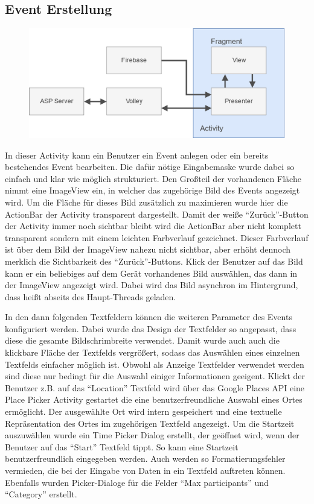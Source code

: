 \documentclass{scrartcl}
\begin{document}
\subsection{Event Erstellung}

\begin{figure}[h!tbp]
  \includegraphics[width=\textwidth]{img/architecture}
\end{figure}

In dieser Activity kann ein Benutzer ein Event anlegen oder ein bereits
bestehendes Event bearbeiten. Die dafür nötige Eingabemaske wurde dabei so
einfach und klar wie möglich strukturiert. Den Großteil der vorhandenen Fläche
nimmt eine ImageView ein, in welcher das zugehörige Bild des Events angezeigt
wird. Um die Fläche für dieses Bild zusätzlich zu maximieren wurde hier die
ActionBar der Activity transparent dargestellt. Damit der weiße
\enquote{Zurück}-Button der Activity immer noch sichtbar bleibt wird die
ActionBar aber nicht komplett transparent sondern mit einem leichten Farbverlauf
gezeichnet. Dieser Farbverlauf ist über dem Bild der ImageView nahezu nicht
sichtbar, aber erhöht dennoch merklich die Sichtbarkeit des
\enquote{Zurück}-Buttons. Klick der Benutzer auf das Bild kann er ein beliebiges
auf dem Gerät vorhandenes Bild auswählen, das dann in der ImageView angezeigt
wird. Dabei wird das Bild asynchron im Hintergrund, dass heißt abseits des
Haupt-Threads geladen.

In den dann folgenden Textfeldern können die weiteren Parameter des Events
konfiguriert werden. Dabei wurde das Design der Textfelder so angepasst, dass
diese die gesamte Bildschrimbreite verwendet. Damit wurde auch auch die
klickbare Fläche der Textfelds vergrößert, sodass das Auswählen eines einzelnen
Textfelds einfacher möglich ist. Obwohl als Anzeige Textfelder verwendet werden
sind diese nur bedingt für die Auswahl einiger Informationen geeigent. Klickt
der Benutzer z.B. auf das \enquote{Location} Textfeld wird über das Google
Places API eine Place Picker Activity gestartet die eine benutzerfreundliche
Auswahl eines Ortes ermöglicht. Der ausgewählte Ort wird intern gespeichert und
eine textuelle Repräsentation des Ortes im zugehörigen Textfeld angezeigt. Um
die Startzeit auszuwählen wurde ein Time Picker Dialog erstellt, der geöffnet
wird, wenn der Benutzer auf das \enquote{Start} Textfeld tippt. So kann eine
Startzeit benutzerfreundlich eingegeben werden. Auch werden so
Formatierungsfehler vermieden, die bei der Eingabe von Daten in ein Textfeld
auftreten können. Ebenfalls wurden Picker-Dialoge für die Felder
\enquote{Max participants} und \enquote{Category} erstellt.
\end{document}
